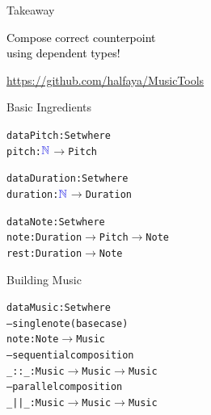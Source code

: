 \documentclass[14pt]{beamer}
\newcommand{\blue}[1]{\textcolor{bcolor}{#1}}
\newcommand{\black}[1]{\textcolor{black}{#1}}
\newcommand{\ared}[1]{\textcolor{ared}{#1}}
\newcommand{\ablue}[1]{\textcolor{ablue}{#1}}
\newcommand{\agreen}[1]{\textcolor{agreen}{#1}}
\newcommand{\aorange}[1]{\textcolor{aorange}{#1}}
\newcommand{\bscreen}[1]{\blue{
\begin{screen}
\begin{center}
\black{#1}
\end{center}
\end{screen}
}}
\begin{document}
\begin{frame}{Takeaway}
\vspace{-5mm}
\bscreen{
\begin{large}
Compose correct counterpoint \\ 
\vspace{2mm}
using dependent types! 
\end{large}
}

\begin{center}
\url{https://github.com/halfaya/MusicTools}
\end{center}
\end{frame}


\begin{frame}[fragile]{Basic Ingredients}
\begin{alltt}
\aorange{data} \ablue{Pitch} : \ablue{Set} \aorange{where}
  \agreen{pitch} : \(\mathbb{\ablue{N}}\) \(\rightarrow\) \ablue{Pitch}
  
\aorange{data} \ablue{Duration} : \ablue{Set} \aorange{where}
  \agreen{duration} : \(\mathbb{\ablue{N}}\) \(\rightarrow\) \ablue{Duration}
  
\aorange{data} \ablue{Note} : \ablue{Set} \aorange{where}
  \agreen{note} : \ablue{Duration} \(\rightarrow\) \ablue{Pitch} \(\rightarrow\) \ablue{Note}
  \agreen{rest} : \ablue{Duration} \(\rightarrow\)          \ablue{Note}
\end{alltt}
\end{frame}

\begin{frame}[fragile]{Building Music}
\begin{alltt}
\aorange{data} \ablue{Music} : \ablue{Set} \aorange{where}
  \ared{-- single note (base case)}
  \agreen{note} : \ablue{Note}  \(\rightarrow\) \ablue{Music}
  \ared{-- sequential composition}
  \agreen{\_::\_} : \ablue{Music} \(\rightarrow\) \ablue{Music} \(\rightarrow\) \ablue{Music}
  \ared{-- parallel composition}
  \agreen{\_||\_} : \ablue{Music} \(\rightarrow\) \ablue{Music} \(\rightarrow\) \ablue{Music}
\end{alltt}
\end{frame}
\end{document}
